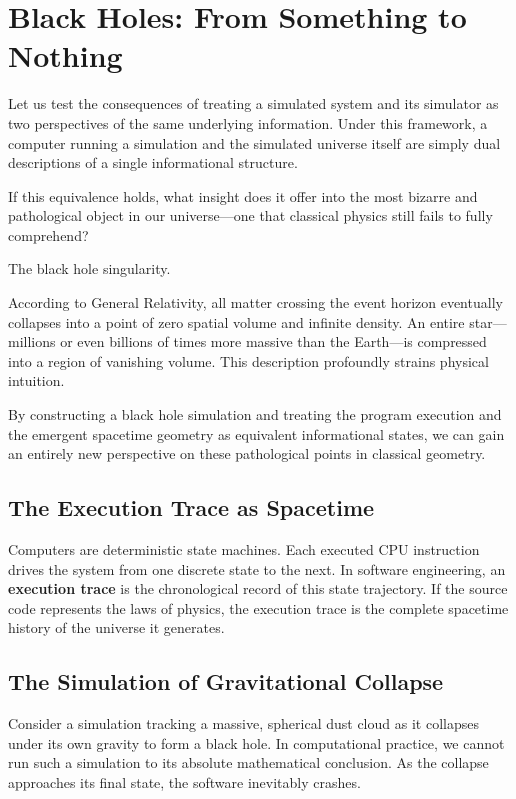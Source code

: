 \chapter{Black Holes: From Something to Nothing}
\label{chap:black-holes}

Let us test the consequences of treating a simulated system and its simulator as two perspectives of the same underlying information.
Under this framework, a computer running a simulation and the simulated universe itself are simply dual descriptions of a single informational structure.

If this equivalence holds, what insight does it offer into the most bizarre and pathological object in our universe—one that classical physics still fails to fully comprehend? 

The black hole singularity.

According to General Relativity, all matter crossing the event horizon eventually collapses into a point of zero spatial volume and infinite density.
An entire star—millions or even billions of times more massive than the Earth—is compressed into a region of vanishing volume.
This description profoundly strains physical intuition.

By constructing a black hole simulation and treating the program execution and the emergent spacetime geometry as equivalent informational states, we can gain an entirely new perspective on these pathological points in classical geometry.

\section{The Execution Trace as Spacetime}

Computers are deterministic state machines.
Each executed CPU instruction drives the system from one discrete state to the next.
In software engineering, an \textbf{execution trace} is the chronological record of this state trajectory.
If the source code represents the laws of physics, the execution trace is the complete spacetime history of the universe it generates.

\section{The Simulation of Gravitational Collapse}

Consider a simulation tracking a massive, spherical dust cloud as it collapses under its own gravity to form a black hole.
In computational practice, we cannot run such a simulation to its absolute mathematical conclusion.
As the collapse approaches its final state, the software inevitably crashes.

